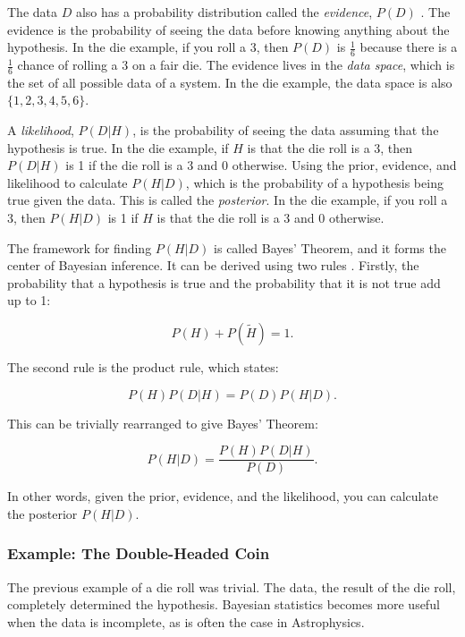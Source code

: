 \documentclass[preprint,longauthor]{aastex631}
\numberwithin{equation}{section}
\begin{document}
The data $D$ also has a probability distribution called the \textit{evidence}, $P(D)$ \citep{brewer1BayesianInference2018}. The evidence is the probability of seeing the data before knowing anything about the hypothesis. In the die example, if you roll a 3, then $P(D)$ is $\frac{1}{6}$ because there is a $\frac{1}{6}$ chance of rolling a 3 on a fair die. The evidence lives in the \textit{data space}, which is the set of all possible data of a system. In the die example, the data space is also $\{1,2,3,4,5,6\}$.

A \textit{likelihood}, $P(D|H)$, is the probability of seeing the data assuming that the hypothesis is true. In the die example, if $H$ is that the die roll is a 3, then $P(D|H)$ is 1 if the die roll is a 3 and 0 otherwise. Using the prior, evidence, and likelihood to calculate $P(H|D)$, which is the probability of a hypothesis being true given the data. This is called the \textit{posterior}. In the die example, if you roll a 3, then $P(H|D)$ is 1 if $H$ is that the die roll is a 3 and 0 otherwise.

The framework for finding $P(H|D)$ is called Bayes' Theorem, and it forms the center of Bayesian inference. It can be derived using two rules \citep{coxProbabilityFrequencyReasonable1946}. Firstly, the probability that a hypothesis is true and the probability that it is not true add up to 1:

\begin{equation}
  P(H) + P(\tilde{H}) = 1.
\end{equation}

The second rule is the product rule, which states:

\begin{equation}
  P(H)P(D|H) = P(D)P(H|D).
\end{equation}

This can be trivially rearranged to give Bayes' Theorem:

\begin{equation}
  \label{eq:bayes_theorem}
  P(H|D) = \frac{P(H)P(D|H)}{P(D)}.
\end{equation}

In other words, given the prior, evidence, and the likelihood, you can calculate the posterior $P(H|D)$.

\subsubsection{Example: The Double-Headed Coin}
The previous example of a die roll was trivial. The data, the result of the die roll, completely determined the hypothesis. Bayesian statistics becomes more useful when the data is incomplete, as is often the case in Astrophysics.
\end{document}
